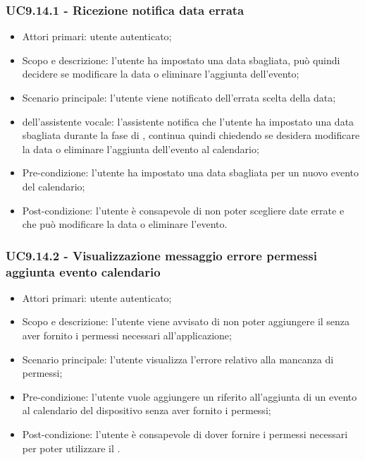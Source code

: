 \subsubsection{UC9.14.1 - Ricezione notifica data errata}
\begin{itemize}
	\item  Attori primari: utente autenticato;
	\item  Scopo e descrizione: l'utente ha impostato una data sbagliata, può quindi decidere se modificare la data o eliminare l'aggiunta dell'evento;
	\item  Scenario principale: l'utente viene notificato dell'errata scelta della data;
	\item  {} dell'assistente vocale: l'assistente notifica che l'utente ha impostato una data sbagliata durante la fase di , continua quindi chiedendo se desidera modificare la data o eliminare l'aggiunta dell'evento al calendario;
	\item  Pre-condizione: l'utente ha impostato una data sbagliata per un nuovo evento del calendario;
	\item  Post-condizione: l'utente è consapevole di non poter scegliere date errate e che può modificare la data o eliminare l'evento.
\end{itemize}
\subsubsection{UC9.14.2 - Visualizzazione messaggio errore permessi aggiunta evento calendario}
\begin{itemize}
	\item  Attori primari: utente autenticato;
	\item  Scopo e descrizione: l'utente viene avvisato di non poter aggiungere il  senza aver fornito i permessi necessari all'applicazione;
	\item  Scenario principale: l'utente visualizza l'errore relativo alla mancanza di permessi;
	\item  Pre-condizione: l'utente vuole aggiungere un  riferito all'aggiunta di un evento al calendario del dispositivo  senza aver fornito i permessi;
	\item  Post-condizione: l'utente è consapevole di dover fornire i permessi necessari per poter utilizzare il .
\end{itemize}
